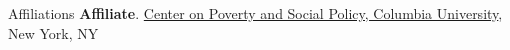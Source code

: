 \begin{rubric}{Affiliations}
\entry*[2022 - present]%
    \textbf{Affiliate}. \href{https://povertycenter.columbia.edu/people}{Center on Poverty and Social Policy, Columbia University}, New York, NY
\end{rubric}
